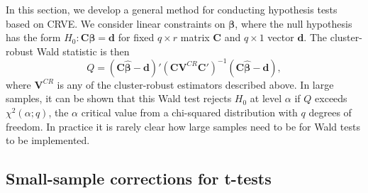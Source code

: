 \documentclass[12pt]{article}\usepackage[]{graphicx}\usepackage[]{color}
\newcommand{\bm}{\mathbf}
\newcommand{\bs}{\boldsymbol}
\begin{document}
In this section, we develop a general method for conducting hypothesis tests based on CRVE. We consider linear constraints on $\bs\beta$, where the null hypothesis has the form $H_0: \bm{C}\bs\beta = \bm{d}$ for fixed $q \times r$ matrix $\bm{C}$ and $q \times 1$ vector $\bm{d}$. 
The cluster-robust Wald statistic is then
\begin{equation}
\label{eq:Wald_stat}
Q = \left(\bm{C}\bs{\hat\beta} - \bm{d}\right)'\left(\bm{C} \bm{V}^{CR} \bm{C}'\right)^{-1}\left(\bm{C}\bs{\hat\beta} - \bm{d}\right),
\end{equation}
where $\bm{V}^{CR}$ is any of the cluster-robust estimators described above.
In large samples, it can be shown that this Wald test rejects $H_0$ at level $\alpha$ if $Q$ exceeds $\chi^2(\alpha; q)$, the $\alpha$ critical value from a chi-squared distribution with $q$ degrees of freedom. 
In practice it is rarely clear how large samples need to be for Wald tests to be implemented.


\subsection{Small-sample corrections for t-tests}
 
\end{document}

